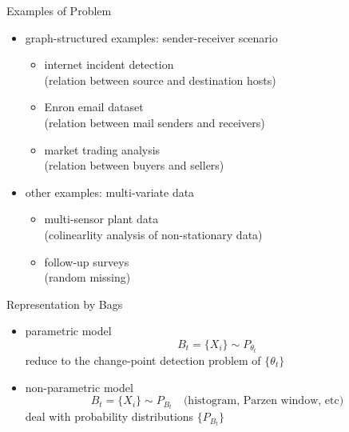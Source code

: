 \documentclass[fleqn,aspectratio=1610]{beamer}
\begin{document}
\begin{frame}[label={sec:org1b9b21a}]{Examples of Problem}
\begin{itemize}
\item graph-structured examples: sender-receiver scenario
\begin{itemize}
\item internet incident detection \\[0pt]
(relation between source and destination hosts)
\item Enron email dataset \\[0pt]
(relation between mail senders and receivers)
\item market trading analysis \\[0pt]
(relation between buyers and sellers)
\end{itemize}

\item other examples: multi-variate data
\begin{itemize}
\item multi-sensor plant data \\[0pt]
(colinearlity analysis of non-stationary data)
\item follow-up surveys \\[0pt]
(random missing)
\end{itemize}
\end{itemize}
\end{frame}

\begin{frame}[label={sec:orgc7354f3}]{Representation by Bags}
\begin{itemize}
\item parametric model
\begin{equation}
  B_t=\{X_{i}\}\sim P_{\theta_t}
\end{equation}
reduce to the change-point detection problem of
\(\{\theta_t\}\)
\item non-parametric model
\begin{equation}
  B_t=\{X_{i}\}\sim P_{B_t}
  \quad\text{(histogram, Parzen window, etc)}
\end{equation}
deal with probability distributions \(\{P_{B_t}\}\)
\end{itemize}
\end{frame}
\end{document}
